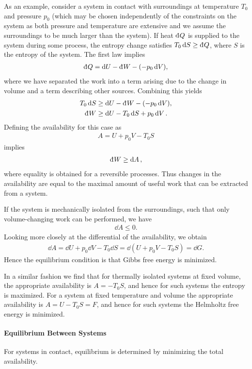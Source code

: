 As an example, consider a system in contact with surroundings at temperature $T_{0}$ and pressure $p_{0}$ (which may be chosen independently of the constraints on the system as both pressure and temperature are extensive and we assume the surroundings to be much larger than the system). If heat $\din{Q}$ is supplied to the system during some process, the entropy change satisfies $T_{0}\dd{S} \geq \din{Q}$, where $S$ is the entropy of the system. The first law implies
\begin{align*}
	\din{Q} = \dd{U} - \din{W} - (-p_{0}\dd{V}),
\end{align*}
where we have separated the work into a term arising due to the change in volume and a term describing other sources. Combining this yields
\begin{align*}
	T_{0}\dd{S} &\geq \dd{U} - \din{W} - (-p_{0}\dd{V}), \\
	\din{W}     &\geq \dd{U} - T_{0}\dd{S}  + p_{0}\dd{V}.
\end{align*}
Defining the availability for this case as
\begin{align*}
	A = U + p_{0}V - T_{0}S
\end{align*}
implies
\begin{align*}
	\din{W} \geq \dd{A},
\end{align*}
where equality is obtained for a reversible processes. Thus changes in the availability are equal to the maximal amount of useful work that can be extracted from a system.

If the system is mechanically isolated from the surroundings, such that only volume-changing work can be performed, we have
\begin{align*}
	\dd{A} \leq 0.
\end{align*}
Looking more closely at the differential of the availability, we obtain
\begin{align*}
	\dd{A} = \dd{U} + p_{0}\dd{V} - T_{0}\dd{S} = \dd(U + p_{0}V - T_{0}S) = \dd{G}.
\end{align*}
Hence the equilibrium condition is that Gibbs free energy is minimized.

In a similar fashion we find that for thermally isolated systems at fixed volume, the appropriate availability is $A = -T_{0}S$, and hence for such systems the entropy is maximized. For a system at fixed temperature and volume the appropriate availability is $A = U - T_{0}S = F$, and hence for such systems the Helmholtz free energy is minimized.

\paragraph{Equilibrium Between Systems}
For systems in contact, equilibrium is determined by minimizing the total availability.


